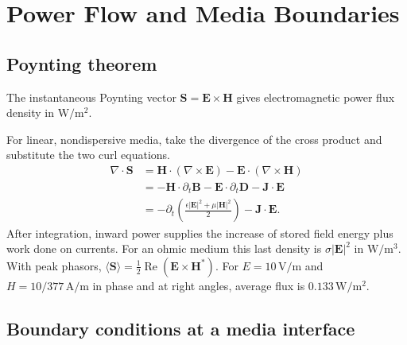 \documentclass[12pt,a4paper]{article}
\begin{document}
\par
\ifdim\dimexpr\pagegoal-\pagetotal\relax<115pt\relax
  \newpage
\fi
\section{Power Flow and Media Boundaries}
\subsection{Poynting theorem}
\begin{tcolorbox}[defbox,title={Poynting vector}]
The instantaneous Poynting vector $\mathbf S=\mathbf E\times\mathbf H$ gives electromagnetic power flux density in $\mathrm{W/m^2}$.
\end{tcolorbox}

For linear, nondispersive media, take the divergence of the cross product and substitute the two curl equations.
\[
\begin{aligned}
\nabla\cdot\mathbf S
 &= \mathbf H\cdot(\nabla\times\mathbf E)-\mathbf E\cdot(\nabla\times\mathbf H)\\
 &= -\mathbf H\cdot\partial_t\mathbf B-\mathbf E\cdot\partial_t\mathbf D-\mathbf J\cdot\mathbf E\\
 &= -\partial_t\left(\frac{\epsilon|\mathbf E|^2+\mu|\mathbf H|^2}{2}\right)
    -\mathbf J\cdot\mathbf E .
\end{aligned}
\]
After integration, inward power supplies the increase of stored field energy plus work done on currents. For an ohmic medium this last density is $\sigma|\mathbf E|^2$ in $\mathrm{W/m^3}$. With peak phasors, $\langle\mathbf S\rangle=\tfrac12\operatorname{Re}(\mathbf E\times\mathbf H^*)$. For $E=10\,\mathrm{V/m}$ and $H=10/377\,\mathrm{A/m}$ in phase and at right angles, average flux is $0.133\,\mathrm{W/m^2}$.
\subsection{Boundary conditions at a media interface}
\begin{tcolorbox}[tikzbox,title={Pillbox and narrow loop},unbreakable]
\centering
{}
\end{tcolorbox}
\end{document}
